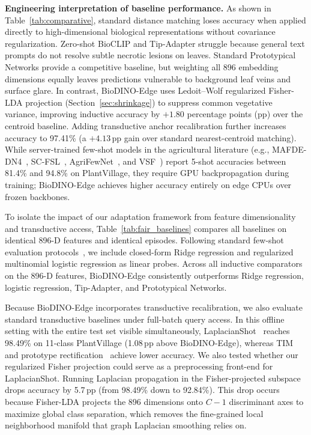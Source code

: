 \documentclass[preprint,12pt]{elsarticle}
\begin{document}
\textbf{Engineering interpretation of baseline performance.} As shown in Table~\ref{tab:comparative}, standard distance matching loses accuracy when applied directly to high-dimensional biological representations without covariance regularization. Zero-shot BioCLIP and Tip-Adapter struggle because general text prompts do not resolve subtle necrotic lesions on leaves. Standard Prototypical Networks provide a competitive baseline, but weighting all 896 embedding dimensions equally leaves predictions vulnerable to background leaf veins and surface glare. In contrast, BioDINO-Edge uses Ledoit--Wolf regularized Fisher-LDA projection (Section~\ref{sec:shrinkage}) to suppress common vegetative variance, improving inductive accuracy by $+1.80$ percentage points (pp) over the centroid baseline. Adding transductive anchor recalibration further increases accuracy to 97.41\% (a $+4.13$\,pp gain over standard nearest-centroid matching). While server-trained few-shot models in the agricultural literature (e.g., MAFDE-DN4~\cite{zhao2024mafde}, SC-FSL~\cite{mu2024few}, AgriFewNet~\cite{babu2025agrifewnet}, and VSF~\cite{zhou2026vsf}) report 5-shot accuracies between 81.4\% and 94.8\% on PlantVillage, they require GPU backpropagation during training; BioDINO-Edge achieves higher accuracy entirely on edge CPUs over frozen backbones.

To isolate the impact of our adaptation framework from feature dimensionality and transductive access, Table~\ref{tab:fair_baselines} compares all baselines on identical 896-D features and identical episodes. Following standard few-shot evaluation protocols~\cite{tian2020rethinking}, we include closed-form Ridge regression and regularized multinomial logistic regression as linear probes. Across all inductive comparators on the 896-D features, BioDINO-Edge consistently outperforms Ridge regression, logistic regression, Tip-Adapter, and Prototypical Networks.

Because BioDINO-Edge incorporates transductive recalibration, we also evaluate standard transductive baselines under full-batch query access. In this offline setting with the entire test set visible simultaneously, LaplacianShot~\cite{ziko2020laplacian} reaches 98.49\% on 11-class PlantVillage (1.08\,pp above BioDINO-Edge), whereas TIM~\cite{boudiaf2020transductive} and prototype rectification~\cite{liu2021bdcspn} achieve lower accuracy. We also tested whether our regularized Fisher projection could serve as a preprocessing front-end for LaplacianShot. Running Laplacian propagation in the Fisher-projected subspace drops accuracy by 5.7\,pp (from 98.49\% down to 92.84\%). This drop occurs because Fisher-LDA projects the 896 dimensions onto $C-1$ discriminant axes to maximize global class separation, which removes the fine-grained local neighborhood manifold that graph Laplacian smoothing relies on.
\end{document}
